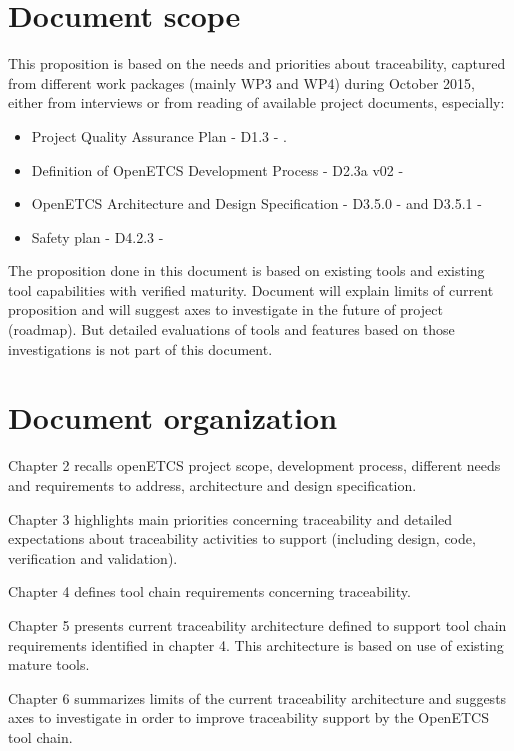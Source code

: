 \documentclass[11pt]{template/openetcs_report}
\begin{document}
\section{Document scope}
This proposition is based on the needs and priorities about traceability, captured from different work packages (mainly WP3 and WP4) during October 2015, either from interviews or from reading of available project documents, especially:
\begin{itemize} 
\item Project Quality Assurance Plan - D1.3 - \cite{qa-plan}.
\item Definition of OpenETCS Development Process - D2.3a v02 - \cite{D2.3a}
\item OpenETCS Architecture and Design Specification - D3.5.0 - \cite{D3.5.0}  and D3.5.1 - \cite{D3.5.3}
\item Safety plan - D4.2.3 - \cite{D4.2.3}
\end{itemize}

The proposition done in this document is based on existing tools and existing tool capabilities with verified maturity. Document will explain limits of current proposition and will suggest axes to investigate in the future of project (roadmap).
But detailed evaluations of tools and features based on those investigations is not part of this document.

\section{Document organization}
Chapter 2 recalls openETCS project scope, development process, different needs and requirements to address, architecture and design specification.

Chapter 3 highlights main priorities concerning traceability and detailed expectations about traceability activities to support (including design, code, verification and validation).

Chapter 4 defines tool chain requirements concerning traceability.

Chapter 5 presents current traceability architecture defined to support tool chain requirements identified in chapter 4. This architecture is based on use of existing mature tools.

Chapter 6 summarizes limits of the current traceability architecture and suggests axes to investigate in order to improve traceability support by the OpenETCS tool chain.
\end{document}
